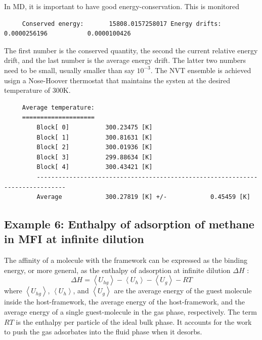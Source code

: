 In MD, it is important to have good energy-conservation. This is monitored
\begin{tiny}
\begin{verbatim}
     Conserved energy:       15808.0157258017 Energy drifts:  0.0000256196           0.0000100426
\end{verbatim}
\end{tiny}
The first number is the conserved quantity, the second the current relative energy drift, and the last number is the average energy drift.
The latter two numbers need to be small, usually smaller than say $10^{-3}$. 
The NVT ensemble is achieved usign a Nose-Hoover thermostat that maintains the systen at the desired temperature of 300K.
\begin{tiny}
\begin{verbatim}
     Average temperature:
     ====================
         Block[ 0]          300.23475 [K]
         Block[ 1]          300.81631 [K]
         Block[ 2]          300.01936 [K]
         Block[ 3]          299.88634 [K]
         Block[ 4]          300.43421 [K]
         ------------------------------------------------------------------------------
         Average            300.27819 [K] +/-            0.45459 [K]
\end{verbatim}
\end{tiny}

\subsection*{Example 6: Enthalpy of adsorption of methane in MFI at infinite dilution}

The affinity of a molecule with the framework can be expressed as the binding energy, or more general, as the enthalpy of adsorption
at infinite dilution $\Delta H$ \cite{Wood1988}:
\begin{equation}
 \Delta H = \left\langle U_{hg}\right\rangle - \left\langle U_{h}\right\rangle - \left\langle U_{g}\right\rangle - RT
\end{equation}
where $\left\langle U_{hg}\right\rangle$, $\left\langle U_{h}\right\rangle$, and $\left\langle U_{g}\right\rangle$
are the average energy of the guest molecule inside the host-framework, the average energy of the host-framework, and
the average energy of a single guest-molecule in the gas phase, respectively.
The term $RT$ is the enthalpy per particle of the ideal bulk phase.
It accounts for the work to push the gas adsorbates into the fluid phase when it desorbs.

